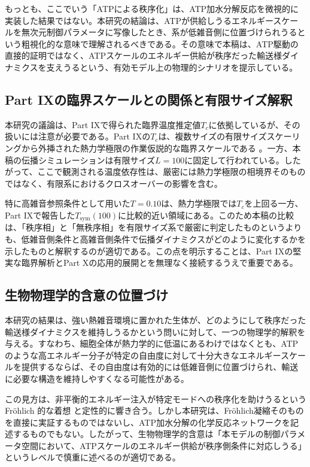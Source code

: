\documentclass[a4paper,11pt,ja=standard,lualatex]{bxjsarticle}
\begin{document}
もっとも、ここでいう「ATPによる秩序化」は、ATP加水分解反応を微視的に実装した結果ではない。本研究の結論は、ATPが供給しうるエネルギースケールを無次元制御パラメータに写像したとき、系が低雑音側に位置づけられうるという粗視化的な意味で理解されるべきである。その意味で本稿は、ATP駆動の直接的証明ではなく、ATPスケールのエネルギー供給が秩序だった輸送様ダイナミクスを支えうるという、有効モデル上の物理的シナリオを提示している。

\subsection{Part IXの臨界スケールとの関係と有限サイズ解釈}
本研究の議論は、Part IXで得られた臨界温度推定値$T_c$に依拠しているが、その扱いには注意が必要である。Part IXの$T_c$は、複数サイズの有限サイズスケーリングから外挿された熱力学極限の作業仮説的な臨界スケールである \cite{Konno2025v9}。一方、本稿の伝播シミュレーションは有限サイズ$L=100$に固定して行われている。したがって、ここで観測される温度依存性は、厳密には熱力学極限の相境界そのものではなく、有限系におけるクロスオーバーの影響を含む。

特に高雑音参照条件として用いた$T=0.10$は、熱力学極限では$T_c$を上回る一方、Part IXで報告した$T_{\mathrm{sym}}(100)$に比較的近い領域にある。このため本稿の比較は、「秩序相」と「無秩序相」を有限サイズ系で厳密に判定したものというよりも、低雑音側条件と高雑音側条件で伝播ダイナミクスがどのように変化するかを示したものと解釈するのが適切である。この点を明示することは、Part IXの堅実な臨界解析とPart Xの応用的展開とを無理なく接続するうえで重要である。

\subsection{生物物理学的含意の位置づけ}
本研究の結果は、強い熱雑音環境に置かれた生体が、どのようにして秩序だった輸送様ダイナミクスを維持しうるかという問いに対して、一つの物理学的解釈を与える。すなわち、細胞全体が熱力学的に低温にあるわけではなくとも、ATPのような高エネルギー分子が特定の自由度に対して十分大きなエネルギースケールを提供するならば、その自由度は有効的には低雑音側に位置づけられ、輸送に必要な構造を維持しやすくなる可能性がある。

この見方は、非平衡的エネルギー注入が特定モードへの秩序化を助けうるという Fröhlich 的な着想 \cite{Frohlich1968} と定性的に響き合う。しかし本研究は、Fröhlich凝縮そのものを直接に実証するものではないし、ATP加水分解の化学反応ネットワークを記述するものでもない。したがって、生物物理学的含意は「本モデルの制御パラメータ空間において、ATPスケールのエネルギー供給が秩序側条件に対応しうる」というレベルで慎重に述べるのが適切である。
\end{document}
